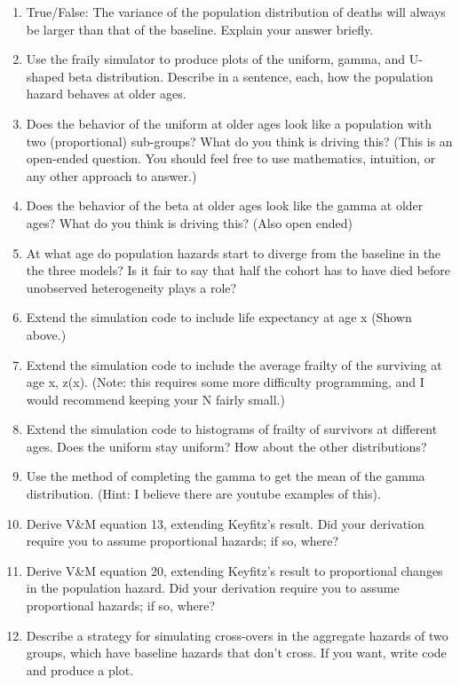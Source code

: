 \documentclass[]{book}
\begin{document}
\begin{enumerate}
\def\labelenumi{\arabic{enumi}.}
\item
  True/False: The variance of the population distribution of deaths will always be larger than that of the baseline. Explain your answer briefly.
\item
  Use the fraily simulator to produce plots of the uniform, gamma, and U-shaped beta distribution. Describe in a sentence, each, how the population hazard behaves at older ages.
\item
  Does the behavior of the uniform at older ages look like a population with two (proportional) sub-groups? What do you think is driving this? (This is an open-ended question. You should feel free to use mathematics, intuition, or any other approach to answer.)
\item
  Does the behavior of the beta at older ages look like the gamma at older ages? What do you think is driving this? (Also open ended)
\item
  At what age do population hazards start to diverge from the baseline in the the three models? Is it fair to say that half the cohort has to have died before unobserved heterogeneity plays a role?
\item
  Extend the simulation code to include life expectancy at age x (Shown above.)
\item
  Extend the simulation code to include the average frailty of the surviving at age x, z(x). (Note: this requires some more difficulty programming, and I would recommend keeping your N fairly small.)
\item
  Extend the simulation code to histograms of frailty of survivors at different ages. Does the uniform stay uniform? How about the other distributions?
\item
  Use the method of completing the gamma to get the mean of the gamma distribution. (Hint: I believe there are youtube examples of this).
\item
  Derive V\&M equation 13, extending Keyfitz's result. Did your derivation require you to assume proportional hazards; if so, where?
\item
  Derive V\&M equation 20, extending Keyfitz's result to proportional changes in the population hazard. Did your derivation require you to assume proportional hazards; if so, where?
\item
  Describe a strategy for simulating cross-overs in the aggregate hazards of two groups, which have baseline hazards that don't cross. If you want, write code and produce a plot.
\end{enumerate}
\end{document}
